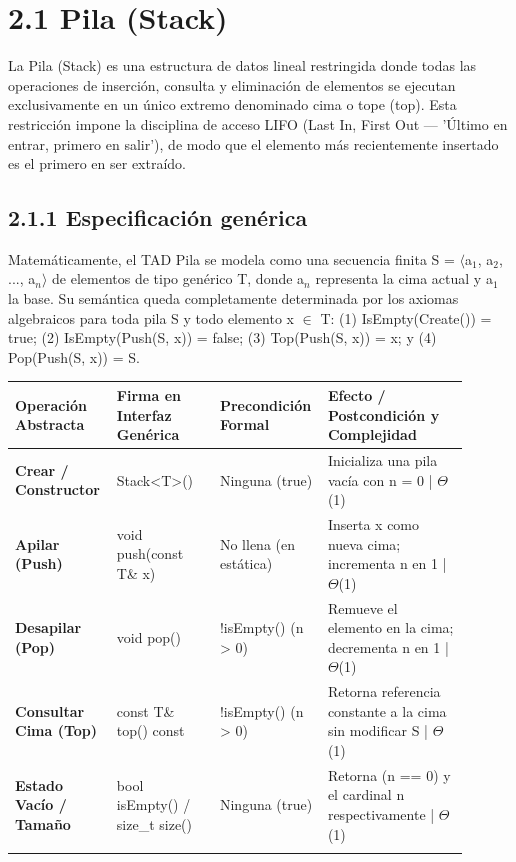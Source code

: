 \documentclass[11pt,letterpaper]{article}
\begin{document}
\section*{2.1 Pila (Stack)}
La Pila (Stack) es una estructura de datos lineal restringida donde todas las operaciones de inserción, consulta y eliminación de elementos se ejecutan exclusivamente en un único extremo denominado cima o tope (top). Esta restricción impone la disciplina de acceso LIFO (Last In, First Out — 'Último en entrar, primero en salir'), de modo que el elemento más recientemente insertado es el primero en ser extraído.\par
\subsection*{2.1.1 Especificación genérica}
Matemáticamente, el TAD Pila se modela como una secuencia finita S = $\langle$a$_1$, a$_2$, ..., a$_n$$\rangle$ de elementos de tipo genérico T, donde a$_n$ representa la cima actual y a$_1$ la base. Su semántica queda completamente determinada por los axiomas algebraicos para toda pila S y todo elemento x $\in$ T: (1) IsEmpty(Create()) = true; (2) IsEmpty(Push(S, x)) = false; (3) Top(Push(S, x)) = x; y (4) Pop(Push(S, x)) = S.\par
\vspace{4pt}\noindent
\begin{tabular}{>{\raggedright\arraybackslash}p{0.194\linewidth}>{\raggedright\arraybackslash}p{0.222\linewidth}>{\raggedright\arraybackslash}p{0.180\linewidth}>{\raggedright\arraybackslash}p{0.305\linewidth}}
\toprule
\textbf{\color{ipnguinda}Operación Abstracta} & \textbf{\color{ipnguinda}Firma en Interfaz Genérica} & \textbf{\color{ipnguinda}Precondición Formal} & \textbf{\color{ipnguinda}Efecto / Postcondición y Complejidad} \\
\midrule
\textbf{Crear / Constructor} & Stack<T>() & Ninguna (true) & Inicializa una pila vacía con n = 0 | $\Theta$(1) \\
\addlinespace[3pt]
\textbf{Apilar (Push)} & void push(const T\& x) & No llena (en estática) & Inserta x como nueva cima; incrementa n en 1 | $\Theta$(1) \\
\addlinespace[3pt]
\textbf{Desapilar (Pop)} & void pop() & !isEmpty() (n > 0) & Remueve el elemento en la cima; decrementa n en 1 | $\Theta$(1) \\
\addlinespace[3pt]
\textbf{Consultar Cima (Top)} & const T\& top() const & !isEmpty() (n > 0) & Retorna referencia constante a la cima sin modificar S | $\Theta$(1) \\
\addlinespace[3pt]
\textbf{Estado Vacío / Tamaño} & bool isEmpty() / size\_t size() & Ninguna (true) & Retorna (n == 0) y el cardinal n respectivamente | $\Theta$(1) \\
\addlinespace[3pt]
\bottomrule
\end{tabular}
\vspace{6pt}\par
\end{document}
